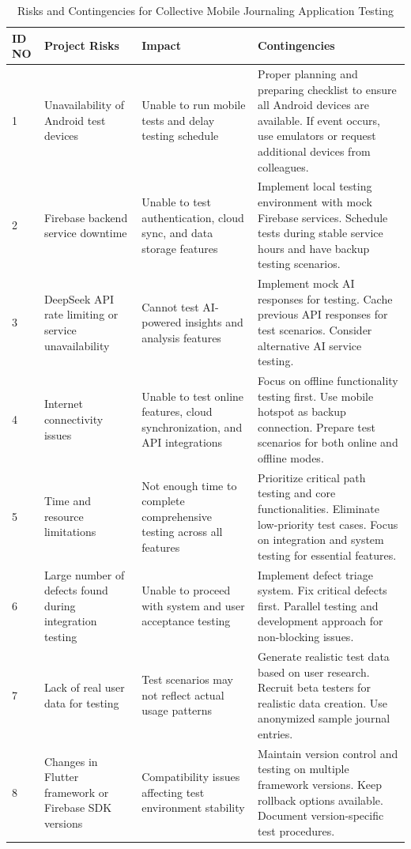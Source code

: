 \begin{table}[H]
\centering
\caption{Risks and Contingencies for Collective Mobile Journaling Application Testing}
\label{tab:risks-contingencies}
\begin{tabular}{|p{1cm}|p{4cm}|p{3cm}|p{6cm}|}
\hline
\textbf{ID NO} & \textbf{Project Risks} & \textbf{Impact} & \textbf{Contingencies} \\
\hline
1 & Unavailability of Android test devices & Unable to run mobile tests and delay testing schedule & Proper planning and preparing checklist to ensure all Android devices are available. If event occurs, use emulators or request additional devices from colleagues. \\
\hline
2 & Firebase backend service downtime & Unable to test authentication, cloud sync, and data storage features & Implement local testing environment with mock Firebase services. Schedule tests during stable service hours and have backup testing scenarios. \\
\hline
3 & DeepSeek API rate limiting or service unavailability & Cannot test AI-powered insights and analysis features & Implement mock AI responses for testing. Cache previous API responses for test scenarios. Consider alternative AI service testing. \\
\hline
4 & Internet connectivity issues & Unable to test online features, cloud synchronization, and API integrations & Focus on offline functionality testing first. Use mobile hotspot as backup connection. Prepare test scenarios for both online and offline modes. \\
\hline
5 & Time and resource limitations & Not enough time to complete comprehensive testing across all features & Prioritize critical path testing and core functionalities. Eliminate low-priority test cases. Focus on integration and system testing for essential features. \\
\hline
6 & Large number of defects found during integration testing & Unable to proceed with system and user acceptance testing & Implement defect triage system. Fix critical defects first. Parallel testing and development approach for non-blocking issues. \\
\hline
7 & Lack of real user data for testing & Test scenarios may not reflect actual usage patterns & Generate realistic test data based on user research. Recruit beta testers for realistic data creation. Use anonymized sample journal entries. \\
\hline
8 & Changes in Flutter framework or Firebase SDK versions & Compatibility issues affecting test environment stability & Maintain version control and testing on multiple framework versions. Keep rollback options available. Document version-specific test procedures. \\

\end{tabular}
\end{table}

